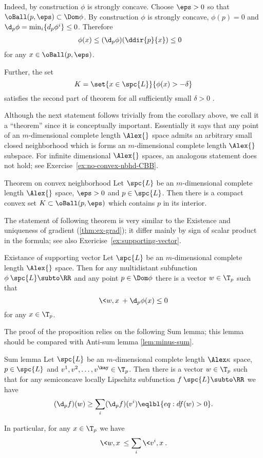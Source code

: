 Indeed, by construction $\phi$ is strongly concave.
Choose $\eps>0$ so that
$\oBall(p,\eps)\subset \Dom \phi$. 
By construction $\phi$ is strongly concave,
$\phi(p)=0$ and
$\d_p\phi=\min_i\{d_p\phi^i\}\le 0$.
Therefore 
\begin{align*}
\phi(x)&
\le (\d_p\phi)(\ddir{p}{x})
\le 0
\end{align*}
for any $x\in \oBall(p,\eps)$.

Further, 
the set
$$K=\set{x\in\spc{L}}{\phi(x)>-\delta}$$
satisfies the second part of theorem for all sufficiently small $\delta>0$ .
\qeds

Although the next statement follows trivially from the corollary above,
we call it a ``theorem'' since it is conceptually important.
Essentially it says that any point of an $m$-dimensional complete length $\Alex{}$ space admits
an arbitrary small closed neighborhood 
which is forms an $m$-dimensional complete length $\Alex{}$ subspace.
For infinite dimensional $\Alex{}$ spaces, 
an analogous statement does not hold;
see Exercise~\ref{ex:no-convex-nbhd-CBB}.

\begin{thm}{Theorem on convex neighborhood}\label{thm:convex-nbhd}
Let $\spc{L}$ be an $m$-dimensional complete length $\Alex{}$ space, 
$\eps>0$ 
and $p\in\spc{L}$.
Then 
there is a compact convex set $K\subset\oBall(p,\eps)$
which contains $p$ in its interior.
\end{thm}

The statement of following theorem is very similar to the Existence and uniqueness of gradient (\ref{thm:ex-grad});
it differ mainly by sign of scalar product in the formula;
see also Exericise~\ref{ex:supporting-vector}.

\begin{thm}{Existance of supporting vector}
\label{prop:support}
Let $\spc{L}$ be an $m$-dimensional complete length $\Alex{}$ space.
Then for any multidistant subfunction $\phi\:\spc{L}\subto\RR$ 
and any point $p\in \Dom\phi$
there is a vector $w\in \T_p$ such that 
\[\<w,x\>+\d_p\phi(x)\le 0\] 
for any $x\in\T_p$.

\end{thm}

The proof of the proposition relies on the following Sum lemma;
this lemma should be compared with Anti-sum lemma \ref{lem:minus-sum}. 

\begin{thm}{Sum lemma}\label{lem:sum}
Let  $\spc{L}$ be an $m$-dimensional complete length $\Alex\kappa$ space, 
$p\in  \spc{L}$ and $v^1,v^2,\dots,v^\kay\in\T_p$.
Then there is a vector $w\in \T_p$ such that for any semiconcave locally Lipschitz subfunction $f\:\spc{L}\subto\RR$ we have
\[(\d_pf)(w)\ge \sum_i(\d_pf)(v^i)\eqlbl{eq:df(w)>0}.\]

In particular, for any $x\in\T_p$ we have 
\[\<w,x\>\le \sum_i\<v^i,x\>.\]

\end{thm}

